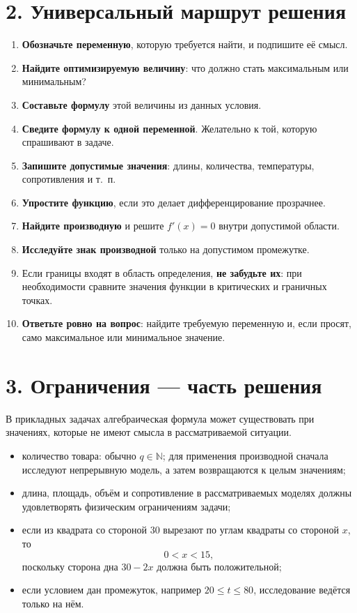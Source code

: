 \documentclass[a4paper,12pt]{article}
\newcommand{\sectionline}{\vspace{1mm}{\color{accent}\hrule height 0.7pt}\vspace{3mm}}
\newcommand{\key}[1]{\textbf{\color{darkaccent}#1}}
\begin{document}
\section*{2. Универсальный маршрут решения}
\sectionline
\begin{enumerate}
  \item \key{Обозначьте переменную}, которую требуется найти, и подпишите её смысл.
  \item \key{Найдите оптимизируемую величину}: что должно стать максимальным или минимальным?
  \item \key{Составьте формулу} этой величины из данных условия.
  \item \key{Сведите формулу к одной переменной}. Желательно к той, которую спрашивают в задаче.
  \item \key{Запишите допустимые значения}: длины, количества, температуры, сопротивления и т.~п.
  \item \key{Упростите функцию}, если это делает дифференцирование прозрачнее.
  \item \key{Найдите производную} и решите $f'(x)=0$ внутри допустимой области.
  \item \key{Исследуйте знак производной} только на допустимом промежутке.
  \item Если границы входят в область определения, \key{не забудьте их}: при необходимости сравните значения функции в критических и граничных точках.
  \item \key{Ответьте ровно на вопрос}: найдите требуемую переменную и, если просят, само максимальное или минимальное значение.
\end{enumerate}

\section*{3. Ограничения --- часть решения}
\sectionline
В прикладных задачах алгебраическая формула может существовать при значениях, которые не имеют смысла в рассматриваемой ситуации.

\begin{itemize}
  \item количество товара: обычно $q\in\mathbb N$; для применения производной сначала исследуют непрерывную модель, а затем возвращаются к целым значениям;
  \item длина, площадь, объём и сопротивление в рассматриваемых моделях должны удовлетворять физическим ограничениям задачи;
  \item если из квадрата со стороной $30$ вырезают по углам квадраты со стороной $x$, то
  \[
    0<x<15,
  \]
  поскольку сторона дна $30-2x$ должна быть положительной;
  \item если условием дан промежуток, например $20\le t\le80$, исследование ведётся только на нём.
\end{itemize}
\end{document}
